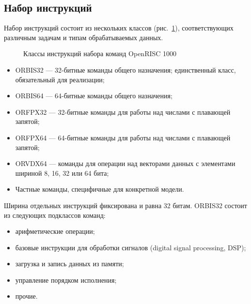 \subsection{Набор инструкций}

Набор инструкций состоит из нескольких классов (рис.~\ref{fig:or1k-isa}), соответствующих различным задачам и типам обрабатываемых данных.

\begin{figure}[htbp]
\centering
{}
\caption{Классы инструкций набора команд OpenRISC 1000}\label{fig:or1k-isa}
\end{figure}

\begin{itemize}
    \item ORBIS32 --- 32-битные команды общего назначения; единственный класс, обязательный для реализации;
    \item ORBIS64 --- 64-битные команды общего назначения;
    \item ORFPX32 --- 32-битные команды для работы над числами с плавающей запятой;
    \item ORFPX64 --- 64-битные команды для работы над числами с плавающей запятой;
    \item ORVDX64 --- команды для операции над векторами данных с элементами шириной 8, 16, 32 или 64 бита;
    \item Частные команды, специфичные для конкретной модели.
\end{itemize}

Ширина отдельных инструкций фиксирована и равна 32 битам. ORBIS32 состоит из следующих подклассов команд:

\begin{itemize}
    \item арифметические операции;
    \item базовые инструкции для обработки сигналов (\abbr digital signal processing, DSP);
    \item загрузка и запись данных из памяти;
    \item управление порядком исполнения;
    \item прочие.
\end{itemize}

